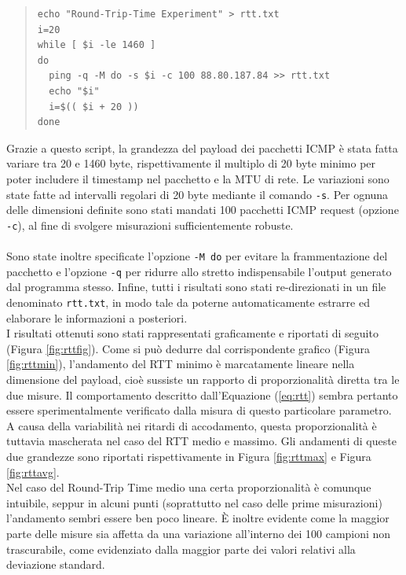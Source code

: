 \documentclass[a4paper,10pt]{article}
\begin{document}
\small
\begin{quote}
\begin{verbatim}
echo "Round-Trip-Time Experiment" > rtt.txt
i=20
while [ $i -le 1460 ]
do
  ping -q -M do -s $i -c 100 88.80.187.84 >> rtt.txt
  echo "$i"
  i=$(( $i + 20 ))
done
\end{verbatim}
\end{quote}
\normalsize
Grazie a questo script, la grandezza del payload dei pacchetti ICMP è stata fatta variare tra 20 e 1460 byte, rispettivamente il multiplo di 20 byte minimo per poter includere il timestamp nel pacchetto e la MTU di rete. Le variazioni sono state fatte ad intervalli regolari di 20 byte mediante il comando \texttt{-s}. Per ognuna delle dimensioni definite sono stati mandati 100 pacchetti ICMP request (opzione \texttt{-c}), al fine di svolgere misurazioni sufficientemente robuste. \\\\
Sono state inoltre specificate l'opzione \texttt{-M do} per evitare la frammentazione del pacchetto e l'opzione \texttt{-q} per ridurre allo stretto indispensabile l'output generato dal programma stesso. Infine, tutti i risultati sono stati re-direzionati in un file denominato \texttt{rtt.txt}, in modo tale da poterne automaticamente estrarre ed elaborare le informazioni a posteriori. \\
\newpage
\noindent
I risultati ottenuti sono stati rappresentati graficamente e riportati di seguito (Figura \ref{fig:rttfig}). Come si può dedurre dal corrispondente grafico (Figura \ref{fig:rttmin}), l'andamento del RTT minimo è marcatamente lineare nella dimensione del payload, cioè sussiste un rapporto di proporzionalità diretta tra le due misure. Il comportamento descritto dall'Equazione (\ref{eq:rtt}) sembra pertanto essere sperimentalmente verificato dalla misura di questo particolare parametro. A causa della variabilità nei ritardi di accodamento, questa proporzionalità è tuttavia mascherata nel caso del RTT medio e massimo. Gli andamenti di queste due grandezze sono riportati rispettivamente in Figura \ref{fig:rttmax} e Figura \ref{fig:rttavg}. \\

\noindent
Nel caso del Round-Trip Time medio una certa proporzionalità è comunque intuibile, seppur in alcuni punti (soprattutto nel caso delle prime misurazioni) l'andamento sembri essere ben poco lineare. È inoltre evidente come la maggior parte delle misure sia affetta da una variazione all'interno dei 100 campioni non trascurabile, come evidenziato dalla maggior parte dei valori relativi alla deviazione standard.\\
\end{document}
